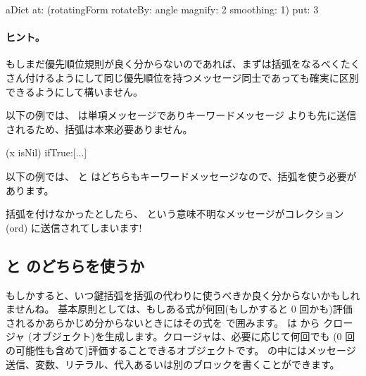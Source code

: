 \documentclass[a4paper,10pt,twoside]{book}
\begin{document}
\begin{code}{}
aDict
   at: (rotatingForm 
          rotateBy: angle	
          magnify: 2 
          smoothing: 1)
   put: 3
\end{code}



\paragraph{ヒント。} もしまだ優先順位規則が良く分からないのであれば、まずは括弧をなるべくたくさん付けるようにして同じ優先順位を持つメッセージ同士であっても確実に区別できるようにして構いません。

以下の例では、 は単項メッセージでありキーワードメッセージ  よりも先に送信されるため、括弧は本来必要ありません。
\begin{code}{}
(x isNil)
   ifTrue:[...]
\end{code}

以下の例では、 と  はどちらもキーワードメッセージなので、括弧を使う必要があります。
\noindent
括弧を付けなかったとしたら、 という意味不明なメッセージがコレクション (ord) に送信されてしまいます!

\subsection{\lct{[ ]} と \lct{( )} のどちらを使うか}
もしかすると、いつ鍵括弧を括弧の代わりに使うべきか良く分からないかもしれませんね。
基本原則としては、もしある式が何回(もしかすると 0 回かも)評価されるかあらかじめ分からないときにはその式を \ct{[ ]} で囲みます。
 は  から クロージャ (\ie オブジェクト)を生成します。クロージャは、必要に応じて何回でも (0 回の可能性も含めて)評価することできるオブジェクトです。\ct{[ ]} の中にはメッセージ送信、変数、リテラル、代入あるいは別のブロックを書くことができます。
\end{document}
